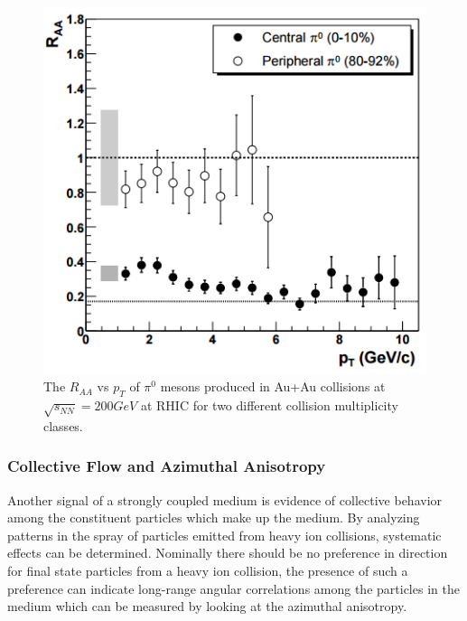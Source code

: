 \begin{figure}[!ht]
\begin{center}
\includegraphics[width=0.64\linewidth]{figs/raa_pi0_aa_cent_periph.png}
\caption{The $R_{AA}$  vs $p_T$ of $\pi^0$ mesons produced in Au+Au collisions at $\sqrt{s_{NN}} = 200 GeV$ at RHIC for two different collision multiplicity classes. ~\cite{PhysRevLett.91.072303}}
\end{center}
\label{fig:RAA_plot}
\end{figure}
\clearpage

\subsubsection{Collective Flow and Azimuthal Anisotropy}
Another signal of a strongly coupled medium is evidence of collective behavior among the constituent particles which make up the medium. By analyzing patterns in the spray of particles emitted from heavy ion collisions, systematic effects can be determined. Nominally there should be no preference in direction for final state particles from a heavy ion collision, the presence of such a preference can indicate long-range angular correlations among the particles in the medium which can be measured by looking at the azimuthal anisotropy.

